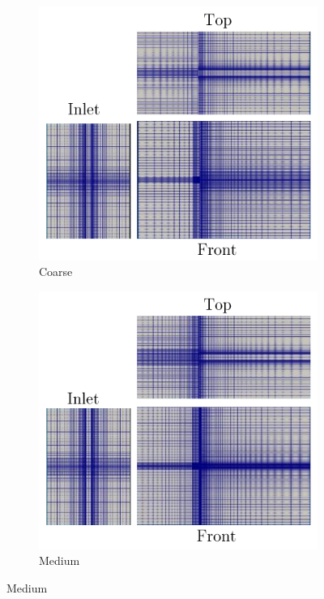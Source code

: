 \documentclass[a4paper,fleqn]{cas-sc}
\begin{document}
\begin{figure}
  \centering
  \begin{subfigure}[h]{0.3\textwidth}
    \includegraphics[width=\textwidth]{figs/figure6a}
    \caption{Coarse}
    \label{fig:coarseMesh}
  \end{subfigure}

  \begin{subfigure}[h]{0.3\textwidth}
    \includegraphics[width=\textwidth]{figs/figure6b}
    \caption{Medium}
    \label{fig:mediumMesh}
  \end{subfigure}


\end{figure}
\end{document}
